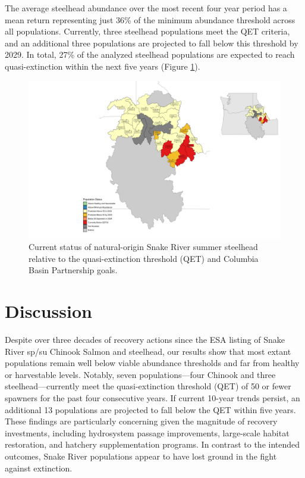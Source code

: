 \documentclass[12pt,a4paper]{article}
\begin{document}
The average steelhead abundance over the most recent four year period has a mean return representing just 36\% of the minimum abundance threshold across all populations. Currently, three steelhead populations meet the QET criteria, and an additional three populations are projected to fall below this threshold by 2029. In total, 27\% of the analyzed steelhead populations are expected to reach quasi-extinction within the next five years (Figure \ref{fig:sth-qet-map}).

\begin{figure}
\includegraphics[width=1\linewidth]{../figures/Steelhead/Steelhead_map_2024} \caption{Current status of natural-origin Snake River summer steelhead relative to the quasi-extinction threshold (QET) and Columbia Basin Partnership goals.}\label{fig:sth-qet-map}
\end{figure}

\section{Discussion}\label{discussion}

Despite over three decades of recovery actions since the ESA listing of Snake River sp/su Chinook Salmon and steelhead, our results show that most extant populations remain well below viable abundance thresholds and far from healthy or harvestable levels. Notably, seven populations---four Chinook and three steelhead---currently meet the quasi-extinction threshold (QET) of 50 or fewer spawners for the past four consecutive years. If current 10-year trends persist, an additional 13 populations are projected to fall below the QET within five years. These findings are particularly concerning given the magnitude of recovery investments, including hydrosystem passage improvements, large-scale habitat restoration, and hatchery supplementation programs. In contrast to the intended outcomes, Snake River populations appear to have lost ground in the fight against extinction.
\end{document}
